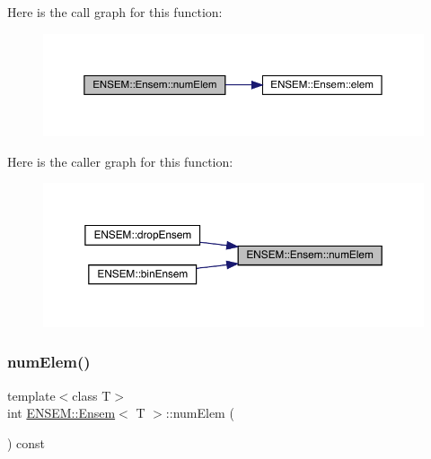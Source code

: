 Here is the call graph for this function\+:
\nopagebreak
\begin{figure}[H]
\begin{center}
\leavevmode
\includegraphics[width=350pt]{d7/d3e/classENSEM_1_1Ensem_a495a563176192200eca2f16978158750_cgraph}
\end{center}
\end{figure}
Here is the caller graph for this function\+:\nopagebreak
\begin{figure}[H]
\begin{center}
\leavevmode
\includegraphics[width=350pt]{d7/d3e/classENSEM_1_1Ensem_a495a563176192200eca2f16978158750_icgraph}
\end{center}
\end{figure}
\mbox{\label{classENSEM_1_1Ensem_a495a563176192200eca2f16978158750}} 
\subsubsection{\texorpdfstring{numElem()}{numElem()}\hspace{0.1cm}{\footnotesize\ttfamily [2/2]}}
{\footnotesize\ttfamily template$<$class T$>$ \\
int \mbox{\hyperlink{classENSEM_1_1Ensem}{E\+N\+S\+E\+M\+::\+Ensem}}$<$ T $>$\+::num\+Elem (\begin{DoxyParamCaption}{ }\end{DoxyParamCaption}) const\hspace{0.3cm}{\ttfamily [inline]}}



